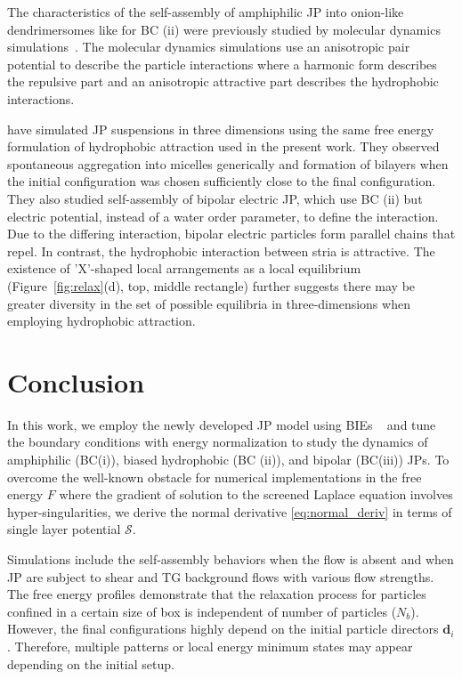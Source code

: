 \documentclass[prb,preprint,showpacs,preprintnumbers,amsmath,amssymb,longbibliography]{revtex4-1}
\newcommand{\dd}{\mathbf{d}}
\newcommand{\SSS}{\mathcal{S}}
\begin{document}
The characteristics of the self-assembly of amphiphilic JP into
onion-like dendrimersomes like for BC (ii) were previously studied by molecular dynamics
simulations~\cite{C9NR05885K}. The molecular dynamics simulations use an
anisotropic pair potential to describe the particle interactions
where a harmonic form describes the repulsive part and an anisotropic
attractive part describes the hydrophobic interactions.

\citet{kohl-cor-che-vee22} have simulated JP suspensions in three
dimensions using the same free energy formulation of hydrophobic
attraction used in the present work. They observed spontaneous
aggregation into micelles generically and formation of bilayers when the
initial configuration was chosen sufficiently close to the final
configuration. They also studied self-assembly of bipolar electric JP,
which use BC (ii) but electric potential, instead of a water order parameter,
to define the interaction.  Due to the differing interaction,
bipolar electric particles form parallel chains that
repel. In contrast, the hydrophobic interaction between stria is
attractive. The existence of 'X'-shaped local arrangements as a local
equilibrium (Figure~\ref{fig:relax}(d), top, middle rectangle) further
suggests there may be greater diversity in the set of possible
equilibria in three-dimensions when employing hydrophobic attraction.


\section{Conclusion}
\label{sec:conclusion}


In this work, we employ the newly developed JP model using BIEs ~\cite{Fu20, Fu2022_JFM} 
and tune the boundary conditions with energy normalization to study the dynamics of 
amphiphilic (BC(i)), biased hydrophobic (BC (ii)), and bipolar (BC(iii)) JPs.
To overcome the well-known 
obstacle for numerical implementations in the free energy $F$ where the gradient of 
solution to the screened Laplace equation involves hyper-singularities, we derive the normal 
derivative \eqref{eq:normal_deriv} in terms of single layer potential $\SSS$.

Simulations include the self-assembly behaviors when the flow is absent and
when JP are subject to shear and TG background flows with various 
flow strengths. The free energy profiles demonstrate that the relaxation process for 
particles confined in a certain size of box is independent of number of particles 
($N_b$). However, the final configurations highly depend on the initial particle 
directors $\dd_i$. Therefore, multiple patterns or local energy minimum states may 
appear depending on the initial setup.
\end{document}
